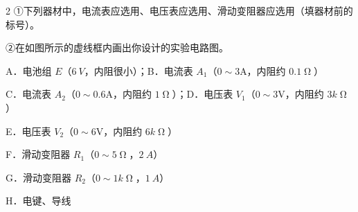 \documentclass[fontset=none]{ctexart}
\begin{document}
\begin{multicols}{2}
①下列器材中，电流表应选用\kongbai、电压表应选用\kongbai、滑动变阻器应选用\kongbai（填器材前的标号）。

②在如图所示的虚线框内画出你设计的实验电路图\kongbai。


A．电池组 $E$（$\unit{6\ V}$，内阻很小）；B．电流表 $A_{1}$（$0\sim3$\unit{A}，内阻约 $\unit{0.1\upOmega}$）

C．电流表 $A_{2}$（$0\sim0.6$\unit{A}，内阻约 $\unit{1\upOmega}$）；D．电压表 $V_{1}$（$0\sim3$\unit{V}，内阻约 $\unit{3k\upOmega}$）

E．电压表 $V_{2}$（$0\sim6$\unit{V}，内阻约 $\unit{6k\upOmega}$）

F．滑动变阻器 $R_{1}$（$0\sim5\unit{\upOmega}$，$\unit{2\ A}$）

G．滑动变阻器 $R_{2}$（$0\sim1\unit{k\upOmega}$，$\unit{1\ A}$）

H．电键、导线

\end{multicols}
\end{document}
